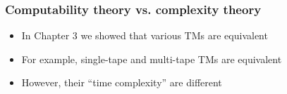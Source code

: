 



\begin{frame}[allowframebreaks] \frametitle{Computability theory vs. complexity theory}
    \begin{itemize}
\item In Chapter 3 we showed that various TMs are equivalent
\item For example, single-tape and multi-tape TMs are equivalent
\item However, their ``time complexity'' are different
\end{itemize}\end{frame}

